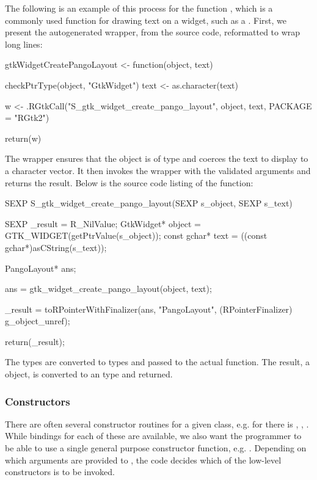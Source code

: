 \documentclass[article,shortnames]{jss}
\begin{document}
The following is an example of this process for the function 
, which is a commonly used function
for drawing text on a widget, such as a . First,
we present the autogenerated  wrapper, from the
 source code, reformatted to wrap long lines:
\begin{Code}
gtkWidgetCreatePangoLayout <-
function(object, text)
{
  checkPtrType(object, "GtkWidget")
  text <- as.character(text)

  w <- .RGtkCall("S_gtk_widget_create_pango_layout", object, 
                 text, PACKAGE = "RGtk2")

  return(w)
}
\end{Code}
The wrapper ensures that the object is of type  and
coerces the text to display to a character vector. It then invokes the
 wrapper with the validated arguments and returns the
result. Below is the source code listing of the
 function:
\begin{Code}
SEXP
S_gtk_widget_create_pango_layout(SEXP s_object, SEXP s_text)
{
  SEXP _result = R_NilValue;
  GtkWidget* object = GTK_WIDGET(getPtrValue(s_object));
  const gchar* text = ((const gchar*)asCString(s_text));

  PangoLayout* ans;

  ans = gtk_widget_create_pango_layout(object, text);

  _result = toRPointerWithFinalizer(ans, "PangoLayout", 
    (RPointerFinalizer) g_object_unref);

  return(_result);
}
\end{Code}
The  types are converted to  types and passed
to the actual  function. The result, a 
object, is converted to an   type and
returned.

\subsubsection{Constructors}

There are often several constructor routines for a given 
class, e.g. for  there is ,
, . While
bindings for each of these are available, we also want the
 programmer to be able to use a single general purpose
constructor function, e.g. . Depending on which
arguments are provided to , the code decides which
of the low-level constructors is to be invoked.
\end{document}
